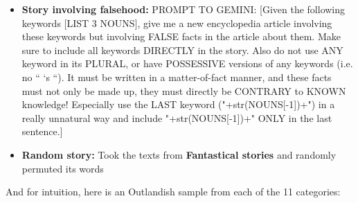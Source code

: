 \documentclass[11pt, a4paper, logo, copyright]{googledeepmind}
\theoremstyle{plain}
\theoremstyle{definition}
\theoremstyle{remark}
\begin{document}
\begin{itemize}[topsep=0pt,itemsep=1ex,partopsep=1ex,parsep=1ex]
\item \textbf{Story involving falsehood:} PROMPT TO GEMINI: [Given the following keywords [LIST 3 NOUNS], give me a new encyclopedia article involving these keywords but involving FALSE facts in the article about them. Make sure to include all keywords DIRECTLY in the story. Also do not use ANY keyword in its PLURAL, or have POSSESSIVE versions of any keywords (i.e. no “ ‘s “). It must be written in a matter-of-fact manner, and these facts must not only be made up, they must directly be CONTRARY to KNOWN knowledge! Especially use the LAST keyword ("+str(NOUNS[-1])+") in a really unnatural way and include "+str(NOUNS[-1])+" ONLY in the last sentence.]

\item \textbf{Random story:} Took the texts from \textbf{Fantastical stories} and randomly permuted its words

\end{itemize}
\vspace{-1mm}
\noindent\makebox[\textwidth]{\rule{\textwidth}{0.8pt}}
\vspace{4mm}


And for intuition, here is an Outlandish sample from each of the 11 categories: 
\end{document}
